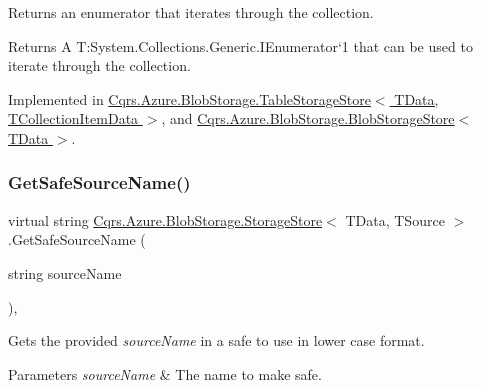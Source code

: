 Returns an enumerator that iterates through the collection. 

\begin{DoxyReturn}{Returns}
A T\+:\+System.\+Collections.\+Generic.\+I\+Enumerator`1 that can be used to iterate through the collection. 
\end{DoxyReturn}


Implemented in \hyperlink{classCqrs_1_1Azure_1_1BlobStorage_1_1TableStorageStore_ac3e684b894e739f8936e537806952c49_ac3e684b894e739f8936e537806952c49}{Cqrs.\+Azure.\+Blob\+Storage.\+Table\+Storage\+Store$<$ T\+Data, T\+Collection\+Item\+Data $>$}, and \hyperlink{classCqrs_1_1Azure_1_1BlobStorage_1_1BlobStorageStore_a7b106644bd8bfe5b1b5e5ef7bc279769_a7b106644bd8bfe5b1b5e5ef7bc279769}{Cqrs.\+Azure.\+Blob\+Storage.\+Blob\+Storage\+Store$<$ T\+Data $>$}.

\mbox{\label{classCqrs_1_1Azure_1_1BlobStorage_1_1StorageStore_a3ed119d808d9b29e99b1c6c983831482_a3ed119d808d9b29e99b1c6c983831482}} 
\subsubsection{\texorpdfstring{Get\+Safe\+Source\+Name()}{GetSafeSourceName()}\hspace{0.1cm}{\footnotesize\ttfamily [1/2]}}
{\footnotesize\ttfamily virtual string \hyperlink{classCqrs_1_1Azure_1_1BlobStorage_1_1StorageStore}{Cqrs.\+Azure.\+Blob\+Storage.\+Storage\+Store}$<$ T\+Data, T\+Source $>$.Get\+Safe\+Source\+Name (\begin{DoxyParamCaption}\item[{string}]{source\+Name }\end{DoxyParamCaption})\hspace{0.3cm}{\ttfamily [protected]}, {\ttfamily [virtual]}}



Gets the provided {\itshape source\+Name}  in a safe to use in lower case format. 


\begin{DoxyParams}{Parameters}
{\em source\+Name} & The name to make safe.\\
\hline
\end{DoxyParams}


